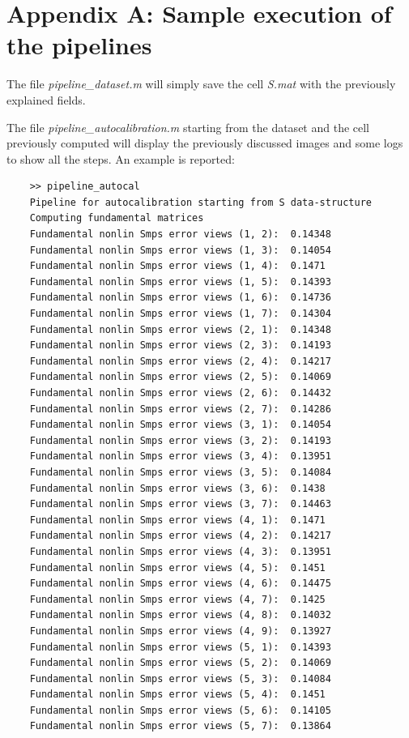 \documentclass[11pt]{article}
\begin{document}
\section{Appendix A: Sample execution of the pipelines}
\noindent The file \textit{pipeline\_dataset.m} will simply save the cell \textit{S.mat} with the previously explained fields.

\bigskip
\noindent The file \textit{pipeline\_autocalibration.m} starting from the dataset and the cell previously computed will display the previously discussed images and some logs to show all the steps. An example is reported:
\begin{verbatim}
    >> pipeline_autocal
    Pipeline for autocalibration starting from S data-structure
    Computing fundamental matrices
    Fundamental nonlin Smps error views (1, 2):	 0.14348 
    Fundamental nonlin Smps error views (1, 3):	 0.14054 
    Fundamental nonlin Smps error views (1, 4):	 0.1471 
    Fundamental nonlin Smps error views (1, 5):	 0.14393 
    Fundamental nonlin Smps error views (1, 6):	 0.14736 
    Fundamental nonlin Smps error views (1, 7):	 0.14304 
    Fundamental nonlin Smps error views (2, 1):	 0.14348 
    Fundamental nonlin Smps error views (2, 3):	 0.14193 
    Fundamental nonlin Smps error views (2, 4):	 0.14217 
    Fundamental nonlin Smps error views (2, 5):	 0.14069 
    Fundamental nonlin Smps error views (2, 6):	 0.14432 
    Fundamental nonlin Smps error views (2, 7):	 0.14286 
    Fundamental nonlin Smps error views (3, 1):	 0.14054 
    Fundamental nonlin Smps error views (3, 2):	 0.14193 
    Fundamental nonlin Smps error views (3, 4):	 0.13951 
    Fundamental nonlin Smps error views (3, 5):	 0.14084 
    Fundamental nonlin Smps error views (3, 6):	 0.1438 
    Fundamental nonlin Smps error views (3, 7):	 0.14463 
    Fundamental nonlin Smps error views (4, 1):	 0.1471 
    Fundamental nonlin Smps error views (4, 2):	 0.14217 
    Fundamental nonlin Smps error views (4, 3):	 0.13951 
    Fundamental nonlin Smps error views (4, 5):	 0.1451 
    Fundamental nonlin Smps error views (4, 6):	 0.14475 
    Fundamental nonlin Smps error views (4, 7):	 0.1425 
    Fundamental nonlin Smps error views (4, 8):	 0.14032 
    Fundamental nonlin Smps error views (4, 9):	 0.13927 
    Fundamental nonlin Smps error views (5, 1):	 0.14393 
    Fundamental nonlin Smps error views (5, 2):	 0.14069 
    Fundamental nonlin Smps error views (5, 3):	 0.14084 
    Fundamental nonlin Smps error views (5, 4):	 0.1451 
    Fundamental nonlin Smps error views (5, 6):	 0.14105 
    Fundamental nonlin Smps error views (5, 7):	 0.13864 

\end{verbatim}
\end{document}
